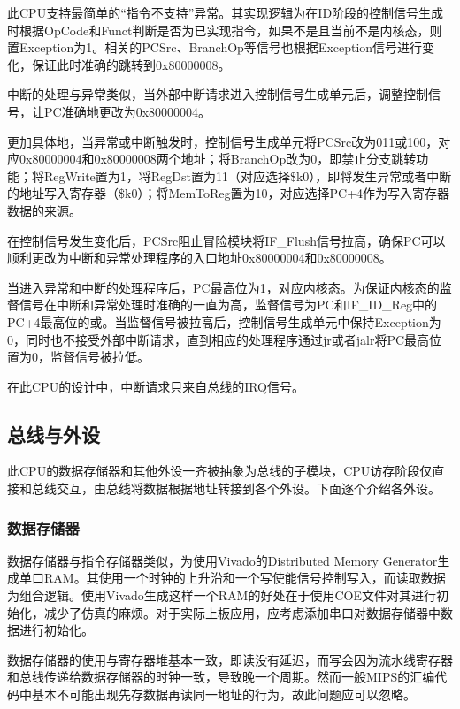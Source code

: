 \documentclass[a4paper]{article}
\begin{document}
此CPU支持最简单的“指令不支持”异常。其实现逻辑为在ID阶段的控制信号生成时根据OpCode和Funct判断是否为已实现指令，如果不是且当前不是内核态，则置Exception为1。相关的PCSrc、BranchOp等信号也根据Exception信号进行变化，保证此时准确的跳转到0x80000008。

中断的处理与异常类似，当外部中断请求进入控制信号生成单元后，调整控制信号，让PC准确地更改为0x80000004。

更加具体地，当异常或中断触发时，控制信号生成单元将PCSrc改为011或100，对应0x80000004和0x80000008两个地址；将BranchOp改为0，即禁止分支跳转功能；将RegWrite置为1，将RegDst置为11（对应选择\$k0），即将发生异常或者中断的地址写入寄存器（\$k0）；将MemToReg置为10，对应选择PC+4作为写入寄存器数据的来源。

在控制信号发生变化后，PCSrc阻止冒险模块将IF\_Flush信号拉高，确保PC可以顺利更改为中断和异常处理程序的入口地址0x80000004和0x80000008。

当进入异常和中断的处理程序后，PC最高位为1，对应内核态。为保证内核态的监督信号在中断和异常处理时准确的一直为高，监督信号为PC和IF\_ID\_Reg中的PC+4最高位的或。当监督信号被拉高后，控制信号生成单元中保持Exception为0，同时也不接受外部中断请求，直到相应的处理程序通过jr或者jalr将PC最高位置为0，监督信号被拉低。

在此CPU的设计中，中断请求只来自总线的IRQ信号。

\subsection{总线与外设\label{sec:bus}}

此CPU的数据存储器和其他外设一齐被抽象为总线的子模块，CPU访存阶段仅直接和总线交互，由总线将数据根据地址转接到各个外设。下面逐个介绍各外设。

\subsubsection{数据存储器}

数据存储器与指令存储器类似，为使用Vivado的Distributed Memory Generator生成单口RAM。其使用一个时钟的上升沿和一个写使能信号控制写入，而读取数据为组合逻辑。使用Vivado生成这样一个RAM的好处在于使用COE文件对其进行初始化，减少了仿真的麻烦。对于实际上板应用，应考虑添加串口对数据存储器中数据进行初始化。

数据存储器的使用与寄存器堆基本一致，即读没有延迟，而写会因为流水线寄存器和总线传递给数据存储器的时钟一致，导致晚一个周期。然而一般MIPS的汇编代码中基本不可能出现先存数据再读同一地址的行为，故此问题应可以忽略。
\end{document}
